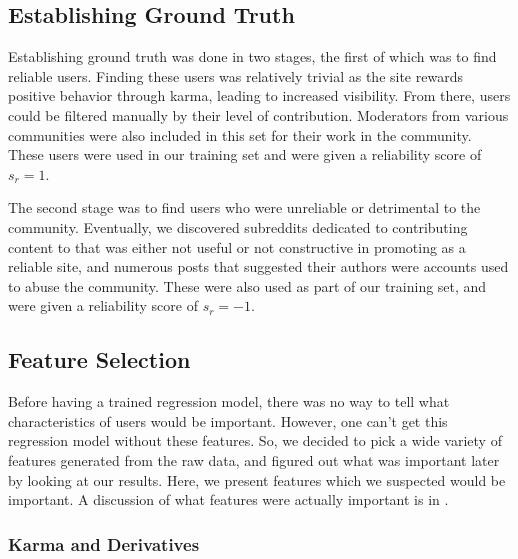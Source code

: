 
\subsection{Establishing Ground Truth} %
\label{sub:establishing_ground_truth}
Establishing ground truth was done in two stages, the first of which was to find
reliable users. Finding these users was relatively trivial as the site rewards
positive behavior through karma, leading to increased visibility. From there,
users could be filtered manually by their level of contribution. Moderators from
various communities were also included in this set for their work in the
\reddit{} community. These users were used in our training set and were given a
reliability score of $s_r = 1$.

The second stage was to find users who were unreliable or detrimental to the
community. Eventually, we discovered subreddits dedicated to contributing
content to \reddit{} that was either not useful or not constructive in promoting
\reddit{} as a reliable site, and numerous posts that suggested their authors
were accounts used to abuse the community. These were also used as part of our
training set, and were given a reliability score of $s_r = -1$.


\subsection{Feature Selection} %
\label{sub:feature_selection}

Before having a trained regression model, there was no way to tell what
characteristics of \reddit{} users would be important. However, one can't get
this regression model without these features. So, we decided to pick a wide
variety of features generated from the raw data, and figured out what was
important later by looking at our results. Here, we present features which we
suspected would be important. A discussion of what features were actually
important is in .

\subsubsection{\reddit{} Karma and Derivatives} %
\label{ssub:reddit_karma_and_derivatives}

